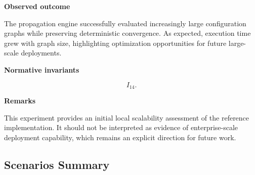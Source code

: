 \documentclass[10pt]{article}
\begin{document}
\textbf{Observed outcome}

The propagation engine successfully evaluated increasingly large configuration
graphs while preserving deterministic convergence. As expected, execution time
grew with graph size, highlighting optimization opportunities for future
large-scale deployments.

\textbf{Normative invariants}

\[
I_{14}.
\]

\textbf{Remarks}

This experiment provides an initial local scalability assessment of the
reference implementation. It should not be interpreted as evidence of
enterprise-scale deployment capability, which remains an explicit direction
for future work.
\subsection{Scenarios Summary}
\end{document}
